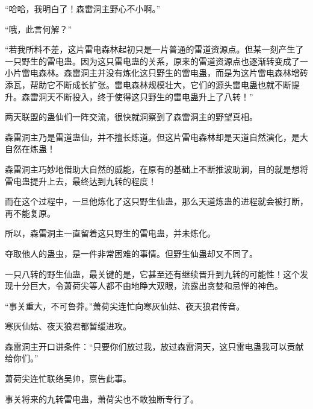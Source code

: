 \begin{this_body}
“哈哈，我明白了！森雷洞主野心不小啊。”

“哦，此言何解？”

“若我所料不差，这片雷电森林起初只是一片普通的雷道资源点。但某一刻产生了一只野生的雷电蛊。因为这只雷电蛊的关系，原来的雷道资源点也逐渐转变成了一小片雷电森林。森雷洞主并没有炼化这只野生的雷电蛊，而是为这片雷电森林增砖添瓦，帮助它不断成长扩张。雷电森林规模壮大，它们的源头雷电蛊也就不断提升。森雷洞天不断投入，终于使得这只野生的雷电蛊升上了八转！”

两天联盟的蛊仙们一阵交流，很快就洞察到了森雷洞主的野望真相。

森雷洞主乃是雷道蛊仙，并不擅长炼道。但这片雷电森林却是天道自然演化，是大自然在炼蛊！

森雷洞主巧妙地借助大自然的威能，在原有的基础上不断推波助澜，目的就是想将雷电蛊提升上去，最终达到九转的程度！

而在这个过程中，一旦他炼化了这只野生仙蛊，那么天道炼蛊的进程就会被打断，再不能复原。

所以，森雷洞主一直留着这只野生的雷电蛊，并未炼化。

夺取他人的蛊虫，是一件非常困难的事情。但野生仙蛊却又不同了。

一只八转的野生仙蛊，最关键的是，它甚至还有继续晋升到九转的可能性！这个发现十分巨大，令萧荷尖等人都不由地睁大双眼，流露出贪婪和忌惮的神色。

“事关重大，不可鲁莽。”萧荷尖连忙向寒灰仙姑、夜天狼君传音。

寒灰仙姑、夜天狼君都暂缓进攻。

森雷洞主开口讲条件：“只要你们放过我，放过森雷洞天，这只雷电蛊我可以贡献给你们。”

萧荷尖连忙联络吴帅，禀告此事。

事关将来的九转雷电蛊，萧荷尖也不敢独断专行了。

\end{this_body}

